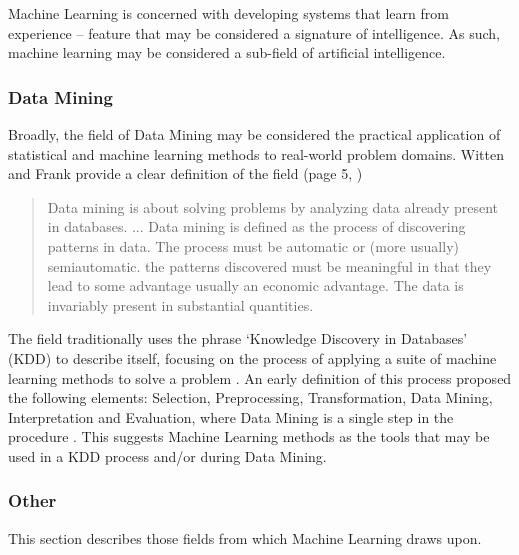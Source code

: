 \documentclass[a4paper, 11pt]{article}
\begin{document}
Machine Learning is concerned with developing systems that learn from experience -- feature that may be considered a signature of intelligence. As such, machine learning may be considered a sub-field of artificial intelligence.

\subsubsection{Data Mining}
Broadly, the field of Data Mining may be considered the practical application of statistical and machine learning methods to real-world problem domains. 
Witten and Frank provide a clear definition of the field (page 5, \cite{Witten2000})

\begin{quotation}
Data mining is about solving problems by analyzing data already present in databases. ... Data mining is defined as the process of discovering patterns in data. The process must be automatic or (more usually) semiautomatic. the patterns discovered must be meaningful in that they lead to some advantage usually an economic advantage. The data is invariably present in substantial quantities.
\end{quotation}

The field traditionally uses the phrase `Knowledge Discovery in Databases' (KDD) to describe itself, focusing on the process of applying a suite of machine learning methods to solve a problem \cite{Frawley1992}. An early definition of this process proposed the following elements: Selection, Preprocessing, Transformation, Data Mining, Interpretation and Evaluation, where Data Mining is a single step in the procedure \cite{Fayyad1996a}.
This suggests Machine Learning methods as the tools that may be used in a KDD process and/or during Data Mining.

\subsubsection{Other}
This section describes those fields from which Machine Learning draws upon. 
\end{document}
